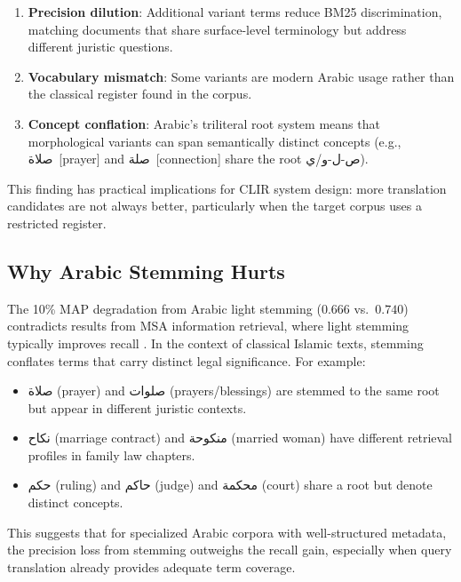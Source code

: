\documentclass[preprint,12pt,authoryear]{elsarticle}
\newcommand{\ar}[1]{{\arabicfont #1}}
\newcommand{\ar}[1]{\textarabic{#1}}
\begin{document}
\begin{enumerate}
    \item \textbf{Precision dilution}: Additional variant terms reduce BM25 discrimination, matching documents that share surface-level terminology but address different juristic questions.

    \item \textbf{Vocabulary mismatch}: Some variants are modern Arabic usage rather than the classical register found in the corpus.

    \item \textbf{Concept conflation}: Arabic's triliteral root system means that morphological variants can span semantically distinct concepts (e.g., \ar{صلاة}~[prayer] and \ar{صلة}~[connection] share the root \ar{ص}-\ar{ل}-\ar{و}/\ar{ي}).
\end{enumerate}

This finding has practical implications for CLIR system design: more translation candidates are not always better, particularly when the target corpus uses a restricted register.

\subsection{Why Arabic Stemming Hurts}

The 10\% MAP degradation from Arabic light stemming ($0.666$ vs.\ $0.740$) contradicts results from MSA information retrieval, where light stemming typically improves recall \citep{larkey2007light}. In the context of classical Islamic texts, stemming conflates terms that carry distinct legal significance. For example:

\begin{itemize}
    \item \ar{صلاة} (prayer) and \ar{صلوات} (prayers/blessings) are stemmed to the same root but appear in different juristic contexts.
    \item \ar{نكاح} (marriage contract) and \ar{منكوحة} (married woman) have different retrieval profiles in family law chapters.
    \item \ar{حكم} (ruling) and \ar{حاكم} (judge) and \ar{محكمة} (court) share a root but denote distinct concepts.
\end{itemize}

This suggests that for specialized Arabic corpora with well-structured metadata, the precision loss from stemming outweighs the recall gain, especially when query translation already provides adequate term coverage.
\end{document}
